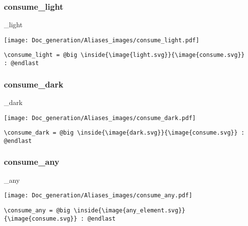 \documentclass{article}
\begin{document}
\subsubsection{consume\_light}
\begin{minipage}{0.45\linewidth}
\raggedright
\begin{spverbatim}
\consume_light 
\end{spverbatim}
\end{minipage}
\begin{minipage}{0.45\linewidth}
\raggedleft
\texttt{[image: Doc\_generation/Aliases\_images/consume\_light.pdf]}
\end{minipage}
\begin{center}
\begin{BVerbatim}
\consume_light = @big \inside{\image{light.svg}}{\image{consume.svg}} : @endlast
\end{BVerbatim}
\end{center}

\subsubsection{consume\_dark}
\begin{minipage}{0.45\linewidth}
\raggedright
\begin{spverbatim}
\consume_dark 
\end{spverbatim}
\end{minipage}
\begin{minipage}{0.45\linewidth}
\raggedleft
\texttt{[image: Doc\_generation/Aliases\_images/consume\_dark.pdf]}
\end{minipage}
\begin{center}
\begin{BVerbatim}
\consume_dark = @big \inside{\image{dark.svg}}{\image{consume.svg}} : @endlast
\end{BVerbatim}
\end{center}

\subsubsection{consume\_any}
\begin{minipage}{0.45\linewidth}
\raggedright
\begin{spverbatim}
\consume_any 
\end{spverbatim}
\end{minipage}
\begin{minipage}{0.45\linewidth}
\raggedleft
\texttt{[image: Doc\_generation/Aliases\_images/consume\_any.pdf]}
\end{minipage}
\begin{center}
\begin{BVerbatim}
\consume_any = @big \inside{\image{any_element.svg}}{\image{consume.svg}} : @endlast
\end{BVerbatim}
\end{center}
\end{document}
